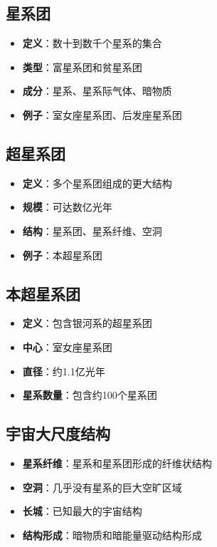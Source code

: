 \documentclass[12pt,UTF8]{ctexbook}
\begin{document}
\subsection{星系团}

\begin{itemize}
  \item \textbf{定义}：数十到数千个星系的集合
  \item \textbf{类型}：富星系团和贫星系团
  \item \textbf{成分}：星系、星系际气体、暗物质
  \item \textbf{例子}：室女座星系团、后发座星系团
\end{itemize}

\subsection{超星系团}

\begin{itemize}
  \item \textbf{定义}：多个星系团组成的更大结构
  \item \textbf{规模}：可达数亿光年
  \item \textbf{结构}：星系团、星系纤维、空洞
  \item \textbf{例子}：本超星系团
\end{itemize}

\subsection{本超星系团}

\begin{itemize}
  \item \textbf{定义}：包含银河系的超星系团
  \item \textbf{中心}：室女座星系团
  \item \textbf{直径}：约1.1亿光年
  \item \textbf{星系数量}：包含约100个星系团
\end{itemize}

\subsection{宇宙大尺度结构}

\begin{itemize}
  \item \textbf{星系纤维}：星系和星系团形成的纤维状结构
  \item \textbf{空洞}：几乎没有星系的巨大空旷区域
  \item \textbf{长城}：已知最大的宇宙结构
  \item \textbf{结构形成}：暗物质和暗能量驱动结构形成
\end{itemize}
\end{document}

